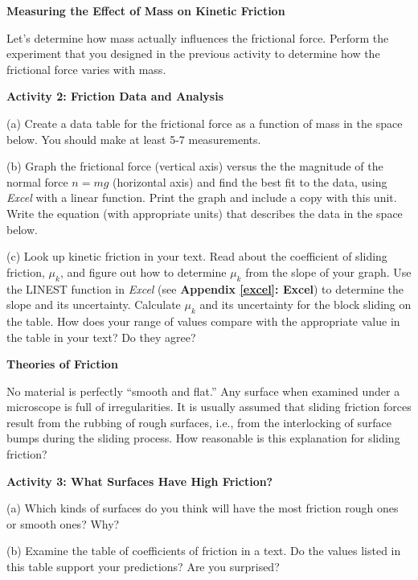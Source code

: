 \textbf{Measuring the Effect of Mass on Kinetic Friction }

Let's determine how mass actually influences the frictional force. Perform the
experiment that you designed in the previous activity to determine how the frictional
force varies with mass. 

\newpage

\textbf{Activity 2: Friction Data and Analysis }

(a) Create a data table for the frictional force as a function of mass in the
space below. You should make at least 5-7 measurements. 
\vspace{45mm}

(b) Graph the frictional force (vertical axis) versus the the magnitude of the normal force $n = mg$ (horizontal axis) and find the best fit to the data, using \textit{Excel} with a linear function. 
Print the graph and include a copy with this unit. Write the equation (with 
appropriate units) that describes the data in the space below. 
\vspace{15mm}

(c) Look up kinetic friction in your text. Read about the coefficient
of sliding friction, \( \mu _{k} \), and figure out how to determine 
\( \mu _{k} \) from the slope of your graph. Use the LINEST function in \textit{Excel} (see \textbf{Appendix \ref{excel}: Excel}) to determine the slope and its uncertainty.  Calculate \( \mu _{k} \) and its uncertainty for the block sliding on
the table. How does your range of values compare with the appropriate value in 
the table in your text? Do they agree?
\vspace{30mm}

\textbf{Theories of Friction} 

No material is perfectly ``smooth and flat.'' Any surface when
examined under a microscope is full of irregularities. It is usually assumed
that sliding friction forces result from the rubbing of rough surfaces, i.e.,
from the interlocking of surface bumps during the sliding process. How reasonable
is this explanation for sliding friction?

\textbf{Activity 3: What Surfaces Have High Friction?} 

(a) Which kinds of surfaces do you think will have the most friction rough ones
or smooth ones? Why?
\vspace{20mm}

(b) Examine the table of coefficients of friction in a text. Do the values listed
in this table support your predictions? Are you surprised? 
\vspace{20mm}

